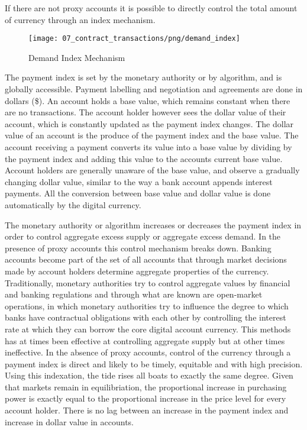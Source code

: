 If there are not proxy accounts it is possible to directly control the total amount of currency
through an index mechanism.  

\begin{figure}[H]
\centering
\texttt{[image: 07\_contract\_transactions/png/demand\_index]}
\caption{Demand Index Mechanism}
\label{fig:demand_index}
\end{figure}

The payment index is set by the monetary authority or by algorithm, and is globally accessible.
Payment labelling and negotiation and agreements are done in dollars (\$). An account holds a base
value, which remains constant when there are no transactions. The account holder however sees the
dollar value of their account, which is constantly updated as the payment index changes. The dollar
value of an account is the produce of the payment index and the base value. The account receiving a
payment converts its value into a base value by dividing by the payment index and adding this value
to the accounts current base value. Account holders are generally unaware of the base value, and
observe a gradually changing dollar value, similar to the way a bank account appends interest
payments. All the conversion between base value and dollar value is done automatically by the
digital currency.

The monetary authority or algorithm increases or decreases the payment index in order to control
aggregate excess supply or aggregate excess demand. In the presence of proxy accounts this control
mechanism breaks down. Banking accounts become part of the set of all accounts that through market
decisions made by account holders determine aggregate properties of the currency. Traditionally,
monetary authorities try to control aggregate values by financial and banking regulations and
through what are known are open-market operations, in which monetary authorities try to influence
the degree to which banks have contractual obligations with each other by controlling the interest
rate at which they can borrow the core digital account currency. This methods has at times been
effective at controlling aggregate supply but at other times ineffective. In the absence of proxy
accounts, control of the currency through a payment index is direct and likely to be timely,
equitable and with high precision. Using this indexation, the tide rises all boats to exactly the
same degree. Given that markets remain in equilibriation, the proportional increase in purchasing
power is exactly equal to the proportional increase in the price level for every account holder.
There is no lag between an increase in the payment index and increase in dollar value in accounts.   

